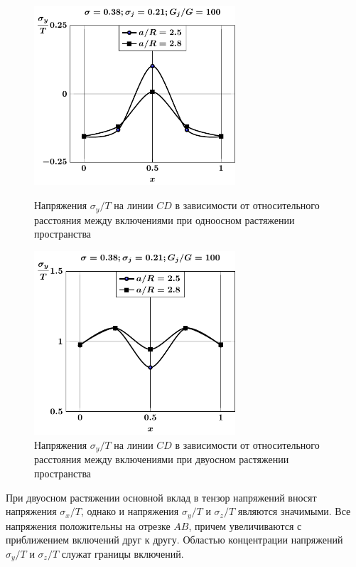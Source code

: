 \begin{figure}[h!]
\centering\footnotesize
\parbox[b]{7.5cm}{\centering\includegraphics[width=7.5cm]{inc13-a-d95-g100-t1-sig_y-cd.pdf}
\caption{Напряжения $\sigma_y/T$ на линии  $CD$ в зависимости от относительного расстояния между включениями при одноосном растяжении пространства
\label{f:8:80}}}\hfil\hfil
\parbox[b]{7.5cm}{\centering\includegraphics[width=7.5cm]{inc13-a-d95-g100-t2-sig_y-cd.pdf}
\caption{Напряжения $\sigma_y/T$ на линии  $CD$ в зависимости от относительного расстояния между включениями при двуосном растяжении пространства
\label{f:8:81}}}
\end{figure}

При двуосном растяжении основной вклад в тензор напряжений вносят напряжения $\sigma_x/T$, однако и напряжения $\sigma_y/T$ и $\sigma_z/T$ являются значимыми. Все напряжения положительны на отрезке $AB$, причем увеличиваются с приближением включений друг к другу. Областью концентрации напряжений $\sigma_y/T$ и $\sigma_z/T$ служат границы включений.

